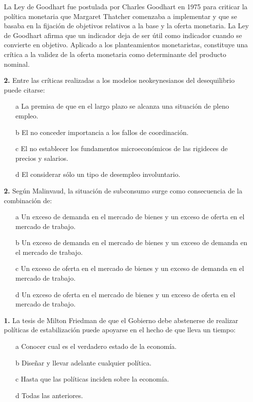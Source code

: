 \documentclass{nuevotema}
\begin{document}
\conceptos


La Ley de Goodhart fue postulada por Charles Goodhart en 1975 para criticar la política monetaria que Margaret Thatcher comenzaba a implementar y que se basaba en la fijación de objetivos relativos a la base y la oferta monetaria. La Ley de Goodhart afirma que un indicador deja de ser útil como indicador cuando se convierte en objetivo. Aplicado a los planteamientos monetaristas, constituye una crítica a la validez de la oferta monetaria como determinante del producto nominal. 

\preguntas

\textbf{2.} Entre las críticas realizadas a los modelos neokeynesianos del desequilibrio puede citarse:

\begin{itemize}
	\item[a] La premisa de que en el largo plazo se alcanza una situación de pleno empleo.
	\item[b] El no conceder importancia a los fallos de coordinación.
	\item[c] El no establecer los fundamentos microeconómicos de las rigideces de precios y salarios.
	\item[d] El considerar sólo un tipo de desempleo involuntario.
\end{itemize}

\textbf{2.} Según Malinvaud, la situación de subconsumo surge como consecuencia de la combinación de:
\begin{itemize}
	\item[a] Un exceso de demanda en el mercado de bienes y un exceso de oferta en el mercado de trabajo.
	\item[b] Un exceso de demanda en el mercado de bienes y un exceso de demanda en el mercado de trabajo.
	\item[c] Un exceso de oferta en el mercado de bienes y un exceso de demanda en el mercado de trabajo.
	\item[d] Un exceso de oferta en el mercado de bienes y un exceso de oferta en el mercado de trabajo.
\end{itemize}

\textbf{1.} La tesis de Milton Friedman de que el Gobierno debe abstenerse de realizar políticas de estabilización puede apoyarse en el hecho de que lleva un tiempo:
\begin{itemize}
	\item[a] Conocer cual es el verdadero estado de la economía.
	\item[b] Diseñar y llevar adelante cualquier política.
	\item[c] Hasta que las políticas inciden sobre la economía.
	\item[d] Todas las anteriores.
\end{itemize}
\end{document}
